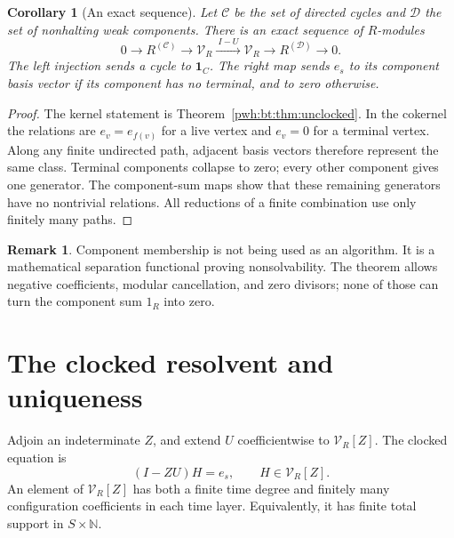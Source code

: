 \documentclass[11pt,letterpaper]{article}
\numberwithin{equation}{section}
\newtheorem{corollary}[theorem]{Corollary}
\theoremstyle{definition}
\newtheorem{remark}[theorem]{Remark}
\newcommand{\N}{\mathbb N}
\newcommand{\one}{\mathbf 1}
\newcommand{\V}{\mathcal V}
\begin{document}
\begin{corollary}[An exact sequence]\label{pwh:bt:cor:exact-sequence}
Let $\mathcal C$ be the set of directed cycles and $\mathcal D$ the set of
nonhalting weak components. There is an exact sequence of $R$-modules
\begin{equation}\label{pwh:bt:eq:exact-sequence}
 0\longrightarrow R^{(\mathcal C)}\longrightarrow\V_R
 \xrightarrow{\ I-U\ }\V_R\longrightarrow R^{(\mathcal D)}
 \longrightarrow0.
\end{equation}
The left injection sends a cycle to $\one_C$. The right map sends $e_s$
to its component basis vector if its component has no terminal, and to
zero otherwise.
\end{corollary}

\begin{proof}
The kernel statement is Theorem~\ref{pwh:bt:thm:unclocked}. In the cokernel the
relations are $e_v=e_{f(v)}$ for a live vertex and $e_v=0$ for a terminal
vertex. Along any finite undirected path, adjacent basis vectors
therefore represent the same class. Terminal components collapse to
zero; every other component gives one generator. The component-sum
maps show that these remaining generators have no nontrivial relations.
All reductions of a finite combination use only finitely many paths.
\end{proof}

\begin{remark}\label{pwh:bt:rem:separation}
Component membership is not being used as an algorithm. It is a
mathematical separation functional proving nonsolvability. The theorem
allows negative coefficients, modular cancellation, and zero divisors;
none of those can turn the component sum $1_R$ into zero.
\end{remark}

\section{The clocked resolvent and uniqueness}\label{pwh:bt:sec:clock}

Adjoin an indeterminate $Z$, and extend $U$ coefficientwise to
$\V_R[Z]$. The clocked equation is
\begin{equation}\label{pwh:bt:eq:clocked}
 (I-ZU)H=e_s,\qquad H\in\V_R[Z].
\end{equation}
An element of $\V_R[Z]$ has both a finite time degree and finitely many
configuration coefficients in each time layer. Equivalently, it has
finite total support in $S\times\N$.
\end{document}
